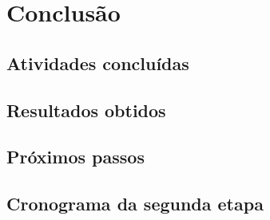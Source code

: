 \chapter[Conclusão]{Conclusão}
\label{cap:conclusao}


\section{Atividades concluídas}

\section{Resultados obtidos}

\section{Próximos passos}

\section{Cronograma da segunda etapa}
